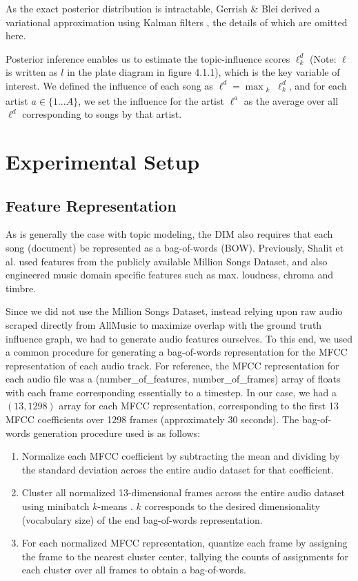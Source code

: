 As the exact posterior distribution is intractable, Gerrish \& Blei derived a variational approximation using Kalman filters \cite{gerrish2010language}, the details of which are omitted here. 

Posterior inference enables us to estimate the topic-influence scores $\ell_k^d$ (Note: $\ell$ is written as $l$ in the plate diagram in figure 4.1.1), which is the key variable of interest. We defined the influence of each song as $\ell^d = \max_{\substack{k}} \ell_k^d$, and for each artist $a \in \{1...A\}$, we set the influence for the artist $\ell^a$ as the average over all $\ell^d$ corresponding to songs by that artist. 

\section{Experimental Setup}
\subsection{Feature Representation}
As is generally the case with topic modeling, the DIM also requires that each song (document) be represented as a bag-of-words (BOW). Previously, Shalit et al. \cite{shalit2013modeling} used features from the publicly available Million Songs Dataset, and also engineered music domain specific features such as max. loudness, chroma and timbre. 

Since we did not use the Million Songs Dataset, instead relying upon raw audio scraped directly from AllMusic to maximize overlap with the ground truth influence graph, we had to generate audio features ourselves. To this end, we used a common procedure \cite{mcfee2012learning} for generating a bag-of-words representation for the MFCC representation of each audio track. For reference, the MFCC representation for each audio file was a (number\_of\_features, number\_of\_frames) array of floats with each frame corresponding essentially to a timestep. In our case, we had a $(13, 1298)$ array for each MFCC representation, corresponding to the first 13 MFCC coefficients over 1298 frames (approximately 30 seconds). The bag-of-words generation procedure used is as follows:

\begin{enumerate}
    \item Normalize each MFCC coefficient by subtracting the mean and dividing by the standard deviation across the entire audio dataset for that coefficient.
    \item Cluster all normalized 13-dimensional frames across the entire audio dataset using minibatch $k$-means \cite{sculley2010web}. $k$ corresponds to the desired dimensionality (vocabulary size) of the end bag-of-words representation.
    \item For each normalized MFCC representation, quantize each frame by assigning the frame to the nearest cluster center, tallying the counts of assignments for each cluster over all frames to obtain a bag-of-words.
\end{enumerate}

